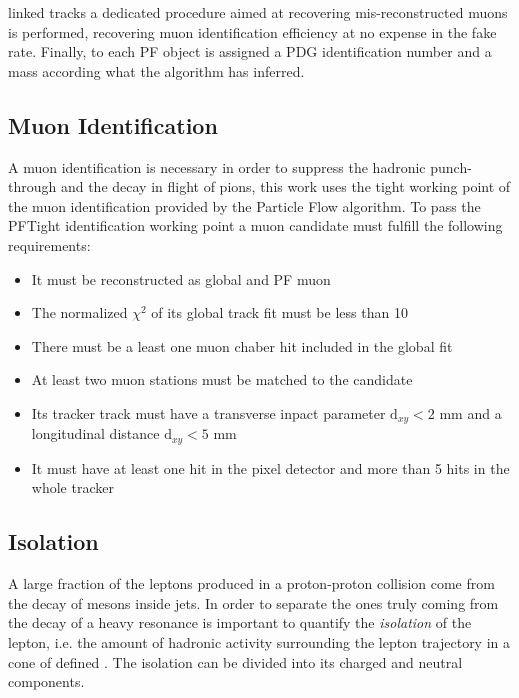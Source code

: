 linked tracks a dedicated procedure aimed at recovering mis-reconstructed muons is performed, recovering muon identification efficiency at no expense in the fake rate. Finally, to each PF object is assigned a PDG identification number and a mass according what the algorithm has inferred.

\subsection{Muon Identification}

A muon identification is necessary in order to suppress the hadronic punch-through and the decay in flight of pions, this work uses the tight working point of the muon identification provided by the Particle Flow algorithm.
To pass the PFTight identification working point a muon candidate must fulfill the following requirements:

\begin{itemize}
\item It must be reconstructed as global and PF muon
\item The normalized $\chi^2$ of its global track fit must be less than 10
\item There must be a least one muon chaber hit included in the global fit
\item At least two muon stations must be matched to the candidate
\item Its tracker track must have a transverse inpact parameter $\mathrm{d}_{xy} < 2$ mm and a longitudinal distance $\mathrm{d}_{xy} < 5$ mm
\item It must have at least one hit in the pixel detector and more than 5 hits in the whole tracker
\end{itemize}

\subsection{Isolation}

A large fraction of the leptons produced in a proton-proton collision come from the decay of mesons inside jets. In order to separate the ones truly coming from the decay of a heavy resonance is important to quantify the \emph{isolation} of the lepton, i.e. the amount of hadronic activity surrounding the lepton trajectory in a cone of defined \DR. The isolation can be divided into its charged and neutral components. 

